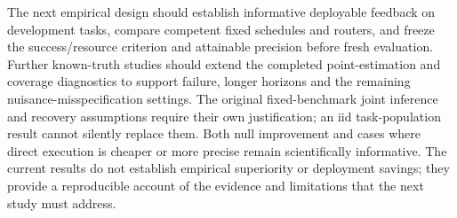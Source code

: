 The next empirical design should establish informative deployable feedback on development tasks, compare
competent fixed schedules and routers, and freeze the success/resource criterion and attainable precision before
fresh evaluation. Further known-truth studies should extend the completed point-estimation and coverage diagnostics to support
failure, longer horizons and the remaining nuisance-misspecification settings. The original fixed-benchmark joint inference and recovery assumptions require their
own justification; an iid task-population result cannot silently replace them. Both null improvement and cases
where direct execution is cheaper or more precise remain scientifically informative. The current results do
not establish empirical superiority or deployment savings; they provide a reproducible account of the evidence
and limitations that the next study must address.
